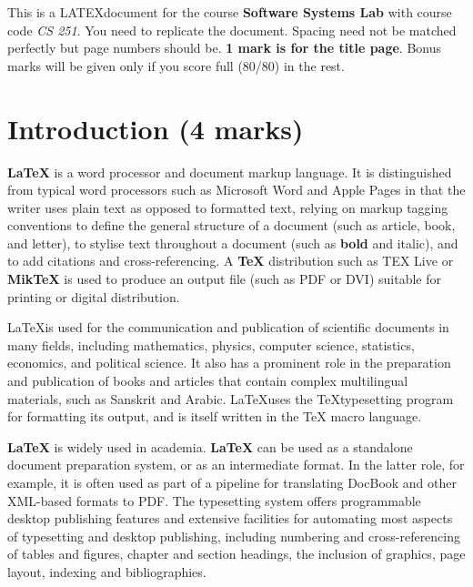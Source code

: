 \documentclass[12pt]{article}
\newcommand{\LATEX}{\LaTeX}
\begin{document}
	
\newpage
\tableofcontents


\newpage

\begin{flushleft}
 This is a LATEXdocument for the course \textbf{Software Systems Lab} with course
code \textit{CS 251}. You need to replicate the document. Spacing need not be
matched perfectly but page numbers should be. \textbf{1 mark is for the title page}.
Bonus marks will be given only if you score full (80/80) in the rest.
\end{flushleft}

 
\section{ Introduction (4 marks) }%
\par


\textbf{\LaTeX} is a word processor and document markup language. It is distinguished
from typical word processors such as Microsoft Word and Apple Pages in that
the writer uses plain text as opposed to formatted text, relying on markup
tagging conventions to define the general structure of a document (such as
article, book, and letter), to stylise text throughout a document (such as \textbf{bold}
and italic), and to add citations and cross-referencing. A \textbf{\TeX} distribution such
as TEX Live or \textbf{MikTeX} is used to produce an output file (such as PDF or DVI)
suitable for printing or digital distribution.
\newline
\par
 
\LaTeX is used for the communication and publication of scientific documents
in many fields, including mathematics, physics, computer science, statistics,
economics, and political science. It also has a prominent role in the preparation
and publication of books and articles that contain complex multilingual materials, such as Sanskrit and Arabic. \LATEX uses the \TeX typesetting program for
formatting its output, and is itself written in the TeX macro language.
\newline
\par


\textbf{\LaTeX} is widely used in academia. \textbf{\LaTeX} can be used as a standalone document preparation system, or as an intermediate format. In the latter role, for
example, it is often used as part of a pipeline for translating DocBook and other
XML-based formats to PDF. The typesetting system offers programmable desktop publishing features and extensive facilities for automating most aspects of
typesetting and desktop publishing, including numbering and cross-referencing
of tables and figures, chapter and section headings, the inclusion of graphics,
page layout, indexing and bibliographies.\newline
\par
\end{document}

